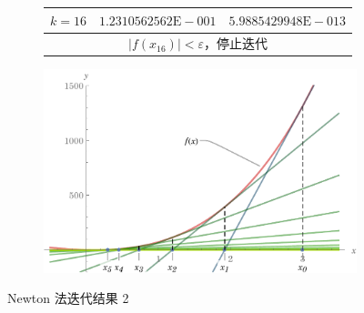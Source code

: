 \documentclass[11pt]{article}
\begin{document}
\begin{figure}
\begin{subfigure}[t]{\textwidth}
\begin{tabular}{|l|c|c|}
            \hline $k = 16$        & $1.2310562562\text{E}{-}001$ & $5.9885429948\text{E}{-}013$ \\
            \hline \multicolumn{3}{|c|}{$|f(x_{16})| < \varepsilon$，停止迭代}                   \\
            \hline
        \end{tabular}
        \label{table:Newton2}
    \end{subfigure}
    \begin{subfigure}[t]{\textwidth}
        \centering
        \includegraphics[scale = 0.8]{Figure/Newton2.pdf}
        \label{figure:Newton2}
    \end{subfigure}
    \caption{Newton 法迭代结果 2 }
    \label{Newton2}
\end{figure}
\end{document}
